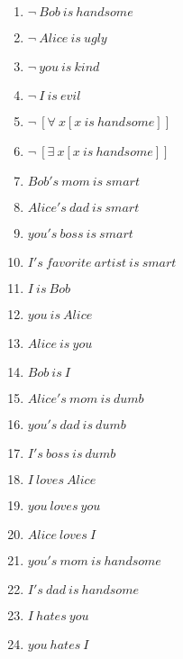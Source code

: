 \documentclass{article}
\begin{document}
\begin{enumerate}
\item $\neg \ Bob \ is \ handsome$

\item $\neg \ Alice \ is \ ugly$

\item $\neg \ you \ is \ kind$

\item $\neg \ I \ is \ evil$

\item $\neg \ [\forall \ x[x \ is \ handsome]]$

\item $\neg \ [\exists \ x[x \ is \ handsome]]$

\item $Bob's \ mom \ is \ smart$

\item $Alice's \ dad \ is \ smart$

\item $you's \ boss \ is \ smart$

\item $I's \ favorite \ artist \ is \ smart$

\item $I \ is \ Bob$

\item $you \ is \ Alice$

\item $Alice \ is \ you$

\item $Bob \ is \ I$

\item $Alice's \ mom \ is \ dumb$

\item $you's \ dad \ is \ dumb$

\item $I's \ boss \ is \ dumb$

\item $I \ loves \ Alice$

\item $you \ loves \ you$

\item $Alice \ loves \ I$

\item $you's \ mom \ is \ handsome$

\item $I's \ dad \ is \ handsome$

\item $I \ hates \ you$

\item $you \ hates \ I$


\end{enumerate}
\end{document}

